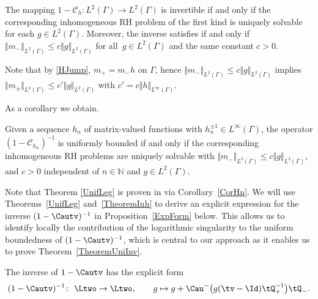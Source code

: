 \begin{Theorem}\label{TheoremInh}
 The mapping $1-\mathcal C_h \colon L^2(\Gamma) \to L^2(\Gamma)$ is invertible if and only if the corresponding inhomogeneous RH problem of the first kind is uniquely solvable for each $g \in L^2(\Gamma)$. Moreover, the inverse satisfies  if and only if $\Vert m_- \Vert_{L^2(\Gamma)} \leq c \Vert g \Vert_{L^2(\Gamma)}$ for all~${g\in L^2(\Gamma)}$ and the same constant $c > 0$.
 \end{Theorem}
 \begin{Remark}
 Note that by \eqref{HJump}, $m_+ = m_- h$ on $\Gamma$, hence $\Vert m_- \Vert_{L^2(\Gamma)} \leq c \Vert g \Vert_{L^2(\Gamma)}$ implies $\Vert m_\pm \Vert_{L^2(\Gamma)} \leq c'\Vert g \Vert_{L^2(\Gamma)}$ with $c'= c\Vert h \Vert_{L^\infty(\Gamma)}$.
 \end{Remark}
 As a corollary we obtain.
 \begin{Corollary}\label{CorHn}
 Given a sequence $h_n$ of matrix-valued functions with $h_n^{\pm 1} \in L^\infty(\Gamma)$, the operator $(1-\mathcal C_{h_n})^{-1}$ is uniformly bounded if and only if the corresponding inhomogeneous RH problems are uniquely solvable with $\Vert m_- \Vert_{L^2(\Gamma)} \leq c \Vert g \Vert_{L^2(\Gamma)}$, and $c > 0$ independent of $n \in \mathbb{N}$ and $g \in L^2(\Gamma)$.
\end{Corollary}
Note that Theorem \ref{UnifLeg} is proven in \cite[Section~4.2]{CD} via Corollary~\ref{CorHn}. We will use Theorems~\ref{UnifLeg} and~\ref{TheoremInh} to derive an explicit expression for the inverse $(1-\Cautv)^{-1}$ in Proposition~\ref{ExpForm} below. This allows us to identify locally the contribution of the logarithmic singularity to the uniform boundedness of $(1-\Cautv)^{-1}$, which is central to our approach as it enables us to prove Theorem~\ref{TheoremUniInv}.
\begin{Proposition}\label{ExpForm}
The inverse of $1-\Cautv$ has the explicit form
\begin{align}\label{ExpInv}
 (1-\Cautv)^{-1}\colon\ \Ltwo \to \Ltwo, \qquad g \mapsto g + \Cau^-\big(g (\tv-\Id) \tQ_+^{-1}\big)\tQ_-.
\end{align}

\end{Proposition}
